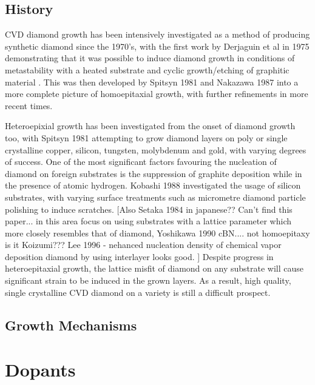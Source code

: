 \subsection{History}
CVD diamond growth has been intensively investigated as a method of producing synthetic diamond since the 1970's, with the first work by Derjaguin et al in 1975 demonstrating that it was possible to induce diamond growth in conditions of metastability with a heated substrate and cyclic growth/etching of graphitic material \cite{derjaguin:1975}. This was then developed by Spitsyn 1981 \cite{spitsyn:1981} and Nakazawa 1987 \cite{nakazawa:1987} into a more complete picture of homoepitaxial growth, with further refinements in more recent times.

Heteroepixial growth has been investigated from the onset of diamond growth too, with Spitsyn 1981 attempting to grow diamond layers on poly or single crystalline copper, silicon, tungsten, molybdenum and gold, with varying degrees of success. One of the most significant factors favouring the nucleation of diamond on foreign substrates is the suppression of graphite deposition while in the presence of atomic hydrogen. Kobashi 1988 \cite{kobashi:1988} investigated the usage of silicon substrates, with varying surface treatments such as micrometre diamond particle polishing to induce scratches. [Also Setaka 1984 in japanese?? Can't find this paper... in this area focus on using substrates with a lattice parameter which more closely resembles that of diamond, Yoshikawa 1990 cBN.... not homoepitaxy is it Koizumi??? Lee 1996 - nehanced nucleation density of chemical vapor deposition diamond by using interlayer looks good. ] Despite progress in heteroepitaxial growth, the lattice misfit of diamond on any substrate will cause significant strain to be induced in the grown layers. As a result, high quality, single crystalline CVD diamond on a variety is still a difficult prospect. 

\subsection{Growth Mechanisms}

\section{Dopants}
\label{section:diamond_doping}
